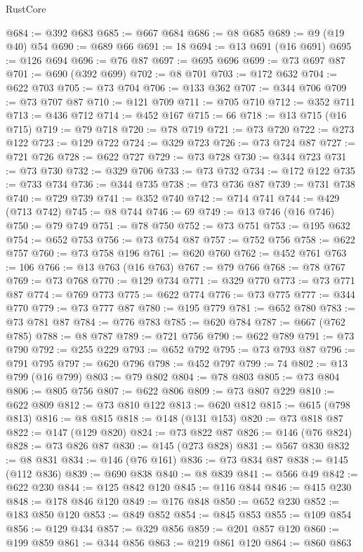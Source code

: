 \begin{lexlean}{RustCore}
\begin{coremodule}
@684 := @392 @683
@685 := @667 @684
@686 := @8 @685
@689 := @9 (@19 @40) @54
@690 := @689 @66
@691 := 18
@694 := @13 @691 (@16 @691)
@695 := @126 @694
@696 := @76 @87
@697 := @695 @696
@699 := @73 @697 @87
@701 := @690 (@392 @699)
@702 := @8 @701
@703 := @172 @632
@704 := @622 @703
@705 := @73 @704
@706 := @133 @362
@707 := @344 @706
@709 := @73 @707 @87
@710 := @121 @709
@711 := @705 @710
@712 := @352 @711
@713 := @436 @712
@714 := @452 @167
@715 := 66
@718 := @13 @715 (@16 @715)
@719 := @79 @718
@720 := @78 @719
@721 := @73 @720
@722 := @273 @122
@723 := @129 @722
@724 := @329 @723
@726 := @73 @724 @87
@727 := @721 @726
@728 := @622 @727
@729 := @73 @728
@730 := @344 @723
@731 := @73 @730
@732 := @329 @706
@733 := @73 @732
@734 := @172 @122
@735 := @733 @734
@736 := @344 @735
@738 := @73 @736 @87
@739 := @731 @738
@740 := @729 @739
@741 := @352 @740
@742 := @714 @741
@744 := @429 (@713 @742)
@745 := @8 @744
@746 := 69
@749 := @13 @746 (@16 @746)
@750 := @79 @749
@751 := @78 @750
@752 := @73 @751
@753 := @195 @632
@754 := @652 @753
@756 := @73 @754 @87
@757 := @752 @756
@758 := @622 @757
@760 := @73 @758 @196
@761 := @620 @760
@762 := @452 @761
@763 := 106
@766 := @13 @763 (@16 @763)
@767 := @79 @766
@768 := @78 @767
@769 := @73 @768
@770 := @129 @734
@771 := @329 @770
@773 := @73 @771 @87
@774 := @769 @773
@775 := @622 @774
@776 := @73 @775
@777 := @344 @770
@779 := @73 @777 @87
@780 := @195 @779
@781 := @652 @780
@783 := @73 @781 @87
@784 := @776 @783
@785 := @620 @784
@787 := @667 (@762 @785)
@788 := @8 @787
@789 := @721 @756
@790 := @622 @789
@791 := @73 @790
@792 := @255 @229
@793 := @652 @792
@795 := @73 @793 @87
@796 := @791 @795
@797 := @620 @796
@798 := @452 @797
@799 := 74
@802 := @13 @799 (@16 @799)
@803 := @79 @802
@804 := @78 @803
@805 := @73 @804
@806 := @805 @756
@807 := @622 @806
@809 := @73 @807 @229
@810 := @622 @809
@812 := @73 @810 @122
@813 := @620 @812
@815 := @615 (@798 @813)
@816 := @8 @815
@818 := @148 (@131 @153)
@820 := @73 @818 @87
@822 := @147 (@129 @820)
@824 := @73 @822 @87
@826 := @146 (@76 @824)
@828 := @73 @826 @87
@830 := @145 (@273 @828)
@831 := @567 @830
@832 := @8 @831
@834 := @146 (@76 @161)
@836 := @73 @834 @87
@838 := @145 (@112 @836)
@839 := @690 @838
@840 := @8 @839
@841 := @566 @49
@842 := @622 @230
@844 := @125 @842 @120
@845 := @116 @844
@846 := @415 @230
@848 := @178 @846 @120
@849 := @176 @848
@850 := @652 @230
@852 := @183 @850 @120
@853 := @849 @852
@854 := @845 @853
@855 := @109 @854
@856 := @129 @434
@857 := @329 @856
@859 := @201 @857 @120
@860 := @199 @859
@861 := @344 @856
@863 := @219 @861 @120
@864 := @860 @863

\end{coremodule}
\end{lexlean}
